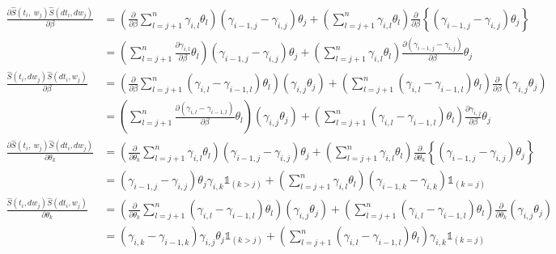 \documentclass[]{article}\usepackage[]{graphicx}\usepackage[]{color}
\begin{document}
\begin{align*}
  \frac{  \partial  \widehat{S} (t_i, ~w_j) \widehat{S} (dt_i, dw_j)   }{  \partial \beta } &=    \left(   \frac{  \partial }{ \partial \beta  } \sum_{l=j+1}^n \gamma_{i,l} \theta_l \right)    \left(    \gamma_{i-1,j} - \gamma_{i,j}   \right) \theta_j       +         \left(  \sum_{l=j+1}^n \gamma_{i,l} \theta_l \right)    \frac{ \partial }{   \partial \beta }   \left\{    \left(    \gamma_{i-1,j} - \gamma_{i,j}   \right) \theta_j   \right\} \\
  &=    \left(    \sum_{l=j+1}^n    \frac{  \partial \gamma_{i,l}}{ \partial \beta  } \theta_l \right)    \left(    \gamma_{i-1,j} - \gamma_{i,j}   \right) \theta_j       +         \left(  \sum_{l=j+1}^n \gamma_{i,l} \theta_l \right)       \frac{ \partial    \left(    \gamma_{i-1,j} - \gamma_{i,j}   \right)}{   \partial \beta }  \theta_j \\
   \frac{  \widehat{S} (t_i, dw_j) \widehat{S} (dt_i, w_j)    }{  \partial \beta } &=  \left( \frac{  \partial }{ \partial \beta  }  \sum_{l=j+1}^n\left( \gamma_{i,l} - \gamma_{i-1,l}   \right) \theta_l \right)  (\gamma_{i,j} \theta_j)      +      \left(   \sum_{l=j+1}^n\left( \gamma_{i,l} - \gamma_{i-1,l}   \right) \theta_l \right) \frac{  \partial }{ \partial \beta  } (\gamma_{i,j} \theta_j)\\
   &=  \left(   \sum_{l=j+1}^n  \frac{  \partial   \left( \gamma_{i,l} - \gamma_{i-1,l}   \right) }{ \partial \beta  }    \theta_l \right)  (\gamma_{i,j} \theta_j)      +      \left(   \sum_{l=j+1}^n\left( \gamma_{i,l} - \gamma_{i-1,l}   \right) \theta_l \right) \frac{  \partial   \gamma_{i,j} }{ \partial \beta  } \theta_j\\
  \frac{  \partial  \widehat{S} (t_i, ~w_j) \widehat{S} (dt_i, dw_j)   }{  \partial \theta_k } &=  \left(   \frac{  \partial }{ \partial \theta_k   } \sum_{l=j+1}^n \gamma_{i,l} \theta_l \right)    \left(    \gamma_{i-1,j} - \gamma_{i,j}   \right) \theta_j       +         \left(  \sum_{l=j+1}^n \gamma_{i,l} \theta_l \right)    \frac{ \partial }{   \partial \theta_k  }   \left\{    \left(    \gamma_{i-1,j} - \gamma_{i,j}   \right) \theta_j   \right\} \\
  &=     \left(    \gamma_{i-1,j} - \gamma_{i,j}   \right) \theta_j  \gamma_{i,k}    \mathds{1}_{(k>j)}     +         \left(  \sum_{l=j+1}^n \gamma_{i,l} \theta_l \right)       \left(    \gamma_{i-1,k} - \gamma_{i,k}   \right) \mathds{1}_{(k=j)}    \\
   \frac{  \widehat{S} (t_i, dw_j) \widehat{S} (dt_i, w_j)    }{  \partial \theta_k } &=  \left( \frac{  \partial }{ \partial \theta_k   }  \sum_{l=j+1}^n\left( \gamma_{i,l} - \gamma_{i-1,l}   \right) \theta_l \right)  (\gamma_{i,j} \theta_j)      +      \left(   \sum_{l=j+1}^n\left( \gamma_{i,l} - \gamma_{i-1,l}   \right) \theta_l \right) \frac{  \partial }{ \partial \theta_k  } (\gamma_{i,j} \theta_j)\\
    &=   ( \gamma_{i,k} - \gamma_{i-1,k}  ) \gamma_{i,j} \theta_j  \mathds{1}_{(k>j)}       +      \left(   \sum_{l=j+1}^n\left( \gamma_{i,l} - \gamma_{i-1,l}   \right) \theta_l \right)   \gamma_{i,k}  \mathds{1}_{(k=j)}
\end{align*}
\end{document}
